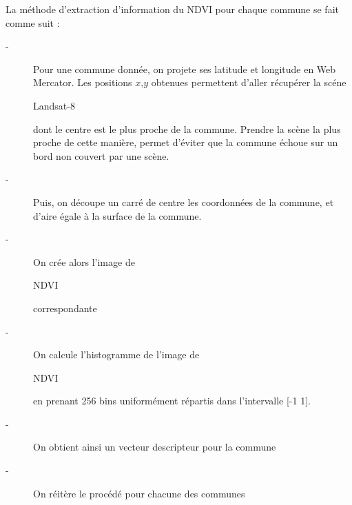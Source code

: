 \documentclass{book}
\begin{document}
La méthode d'extraction d'information du NDVI pour chaque commune se fait comme suit :
\begin{description}
\item[-] Pour une commune donnée, on projete ses latitude et longitude en Web Mercator. Les positions $x$,$y$ obtenues permettent d'aller récupérer 
la scéne \begin{itshape}Landsat-8\end{itshape} dont le centre est le plus proche de la commune. Prendre la scène la plus proche de cette manière,
permet d'éviter que la commune échoue sur un bord non couvert par une scène.
\item[-] Puis, on découpe un carré de centre les coordonnées de la  commune, et d'aire égale à la surface de la commune.
\item[-] On crée alors l'image de \begin{itshape}NDVI\end{itshape} correspondante
\item[-] On calcule l'histogramme de l'image de \begin{itshape}NDVI\end{itshape} en prenant 256 bins uniformément répartis dans l'intervalle [-1 1].
\item[-] On obtient ainsi un vecteur descripteur pour la commune
\item[-] On réitère le procédé pour chacune des communes
\end{description}
\end{document}
